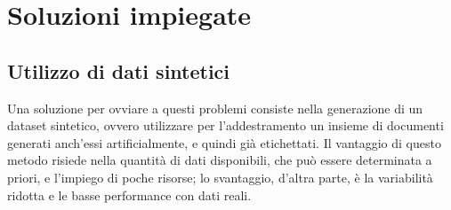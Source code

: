 \section{Soluzioni impiegate}
	\subsection{Utilizzo di dati sintetici}
		Una soluzione per ovviare a questi problemi consiste nella generazione di un dataset sintetico, ovvero utilizzare 
		per l'addestramento un insieme di documenti generati anch'essi artificialmente, e quindi già etichettati.
		Il vantaggio di questo metodo risiede nella quantità di dati disponibili, che può essere determinata a priori, e
		l'impiego di poche risorse; lo svantaggio, d'altra parte, è la variabilità ridotta e le basse performance con dati reali.
